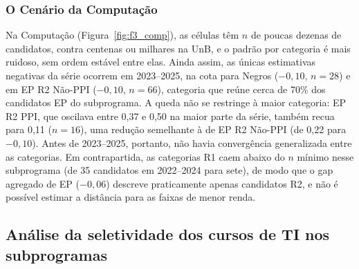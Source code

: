 \documentclass[12pt]{article}
\begin{document}
\subsubsection{O Cenário da Computação}
Na Computação (Figura~\ref{fig:f3_comp}), as células têm $n$ de poucas dezenas de candidatos, contra centenas ou milhares na UnB, e o padrão por categoria é mais ruidoso, sem ordem estável entre elas. Ainda assim, as únicas estimativas negativas da série ocorrem em 2023--2025, na cota para Negros ($-0{,}10$, $n=28$) e em EP R2 Não-PPI ($-0{,}10$, $n=66$), categoria que reúne cerca de 70\% dos candidatos EP do subprograma. A queda não se restringe à maior categoria: EP R2 PPI, que oscilava entre 0,37 e 0,50 na maior parte da série, também recua para 0,11 ($n=16$), uma redução semelhante à de EP R2 Não-PPI (de 0,22 para $-0{,}10$). Antes de 2023--2025, portanto, não havia convergência generalizada entre as categorias. Em contrapartida, as categorias R1 caem abaixo do $n$ mínimo nesse subprograma (de 35 candidatos em 2022--2024 para sete), de modo que o gap agregado de EP ($-0{,}06$) descreve praticamente apenas candidatos R2, e não é possível estimar a distância para as faixas de menor renda.

\subsection{Análise da seletividade dos cursos de TI nos subprogramas}
\end{document}
